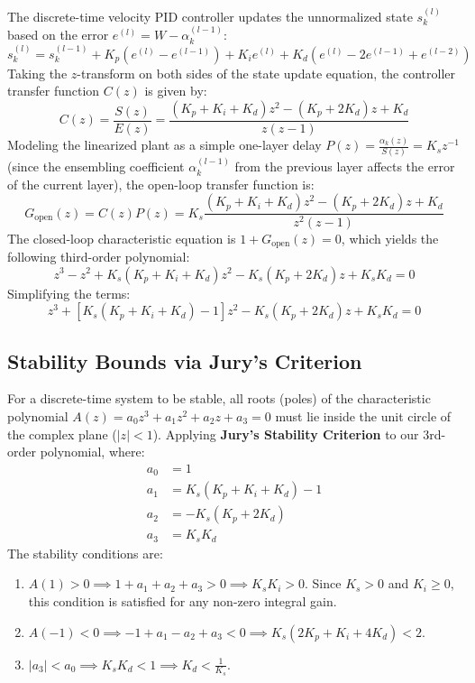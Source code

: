 The discrete-time velocity PID controller updates the unnormalized state $s_k^{(l)}$ based on the error $e^{(l)} = W - \alpha_k^{(l-1)}$:
\begin{equation}
s_k^{(l)} = s_k^{(l-1)} + K_p (e^{(l)} - e^{(l-1)}) + K_i e^{(l)} + K_d (e^{(l)} - 2e^{(l-1)} + e^{(l-2)})
\end{equation}
Taking the $z$-transform on both sides of the state update equation, the controller transfer function $C(z)$ is given by:
\begin{equation}
C(z) = \frac{S(z)}{E(z)} = \frac{(K_p + K_i + K_d)z^2 - (K_p + 2K_d)z + K_d}{z(z - 1)}
\end{equation}
Modeling the linearized plant as a simple one-layer delay $P(z) = \frac{\alpha_k(z)}{S(z)} = K_s z^{-1}$ (since the ensembling coefficient $\alpha_k^{(l-1)}$ from the previous layer affects the error of the current layer), the open-loop transfer function is:
\begin{equation}
G_{\text{open}}(z) = C(z)P(z) = K_s \frac{(K_p + K_i + K_d)z^2 - (K_p + 2K_d)z + K_d}{z^2(z - 1)}
\end{equation}
The closed-loop characteristic equation is $1 + G_{\text{open}}(z) = 0$, which yields the following third-order polynomial:
\begin{equation}
z^3 - z^2 + K_s(K_p + K_i + K_d)z^2 - K_s(K_p + 2K_d)z + K_s K_d = 0
\end{equation}
Simplifying the terms:
\begin{equation}
z^3 + \left[ K_s(K_p + K_i + K_d) - 1 \right] z^2 - K_s(K_p + 2K_d)z + K_s K_d = 0
\end{equation}

\subsection{Stability Bounds via Jury's Criterion}
For a discrete-time system to be stable, all roots (poles) of the characteristic polynomial $A(z) = a_0 z^3 + a_1 z^2 + a_2 z + a_3 = 0$ must lie inside the unit circle of the complex plane ($|z| < 1$).
Applying \textbf{Jury's Stability Criterion} to our 3rd-order polynomial, where:
\begin{align}
a_0 &= 1 \\
a_1 &= K_s(K_p + K_i + K_d) - 1 \\
a_2 &= -K_s(K_p + 2K_d) \\
a_3 &= K_s K_d
\end{align}
The stability conditions are:
\begin{enumerate}
    \item $A(1) > 0 \implies 1 + a_1 + a_2 + a_3 > 0 \implies K_s K_i > 0$. Since $K_s > 0$ and $K_i \ge 0$, this condition is satisfied for any non-zero integral gain.
    \item $A(-1) < 0 \implies -1 + a_1 - a_2 + a_3 < 0 \implies K_s(2K_p + K_i + 4K_d) < 2$.
    \item $|a_3| < a_0 \implies K_s K_d < 1 \implies K_d < \frac{1}{K_s}$.
\end{enumerate}

